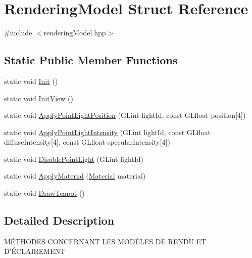 \hypertarget{struct_rendering_model}{\section{Rendering\+Model Struct Reference}
\label{struct_rendering_model}
}


{\ttfamily \#include $<$rendering\+Model.\+hpp$>$}

\subsection*{Static Public Member Functions}
\begin{DoxyCompactItemize}
\item 
static void \hyperlink{struct_rendering_model_aacbef0bb16dc69563ec64034f31acd58}{Init} ()
\item 
static void \hyperlink{struct_rendering_model_adabaa9b1f8ba171e50a62f4ef78ff28b}{Init\+View} ()
\item 
static void \hyperlink{struct_rendering_model_a0b2c2babe4ea5154ef783e229729f1c9}{Apply\+Point\+Light\+Position} (G\+Lint light\+Id, const G\+Lfloat position\mbox{[}4\mbox{]})
\item 
static void \hyperlink{struct_rendering_model_aadeef00a15e4310a0f0ea69f87884735}{Apply\+Point\+Light\+Intensity} (G\+Lint light\+Id, const G\+Lfloat diffuse\+Intensity\mbox{[}4\mbox{]}, const G\+Lfloat specular\+Intensity\mbox{[}4\mbox{]})
\item 
static void \hyperlink{struct_rendering_model_a00bf18c5a373fbd8d80edebd093362df}{Disable\+Point\+Light} (G\+Lint light\+Id)
\item 
static void \hyperlink{struct_rendering_model_a561385fa01420555b97f2bf22912eae6}{Apply\+Material} (\hyperlink{struct_material}{Material} material)
\item 
static void \hyperlink{struct_rendering_model_ad70a68f53f3d8f9802677fa21b5b9c16}{Draw\+Teapot} ()
\end{DoxyCompactItemize}


\subsection{Detailed Description}
MÉ\+T\+H\+O\+D\+E\+S C\+O\+N\+C\+E\+R\+N\+A\+N\+T L\+E\+S M\+O\+DÈ\+L\+E\+S D\+E R\+E\+N\+D\+U E\+T D’É\+C\+L\+A\+I\+R\+E\+M\+E\+N\+T 

